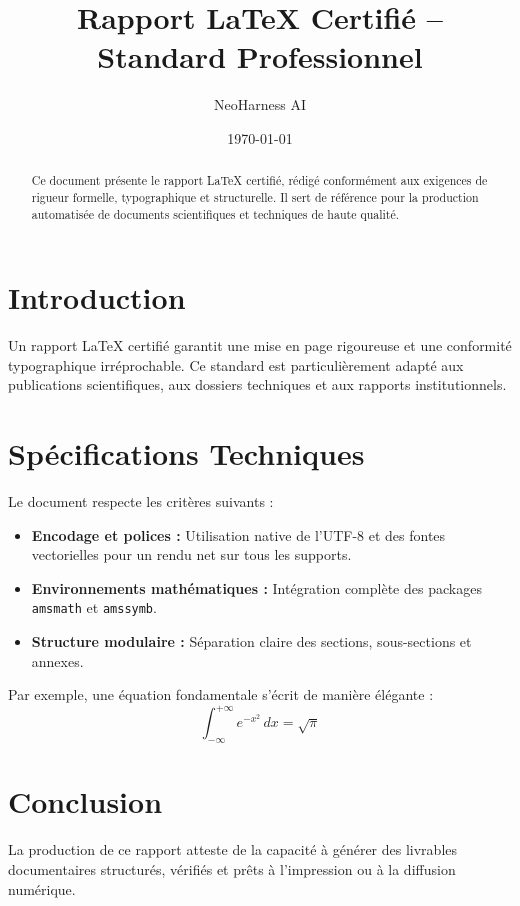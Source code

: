 \documentclass[11pt,a4paper]{article}
\title{\textbf{Rapport LaTeX Certifié -- Standard Professionnel}}
\author{NeoHarness AI}
\date{\today}
\begin{document}
\maketitle

\begin{abstract}
Ce document présente le rapport LaTeX certifié, rédigé conformément aux exigences de rigueur formelle, typographique et structurelle. Il sert de référence pour la production automatisée de documents scientifiques et techniques de haute qualité.
\end{abstract}

\section{Introduction}
Un rapport LaTeX certifié garantit une mise en page rigoureuse et une conformité typographique irréprochable. Ce standard est particulièrement adapté aux publications scientifiques, aux dossiers techniques et aux rapports institutionnels.

\section{Spécifications Techniques}
Le document respecte les critères suivants :
\begin{itemize}
    \item \textbf{Encodage et polices :} Utilisation native de l'UTF-8 et des fontes vectorielles pour un rendu net sur tous les supports.
    \item \textbf{Environnements mathématiques :} Intégration complète des packages \texttt{amsmath} et \texttt{amssymb}.
    \item \textbf{Structure modulaire :} Séparation claire des sections, sous-sections et annexes.
\end{itemize}

Par exemple, une équation fondamentale s'écrit de manière élégante :
\begin{equation}
    \int_{-\infty}^{+\infty} e^{-x^2} \, dx = \sqrt{\pi}
\end{equation}

\section{Conclusion}
La production de ce rapport atteste de la capacité à générer des livrables documentaires structurés, vérifiés et prêts à l'impression ou à la diffusion numérique.
\end{document}
